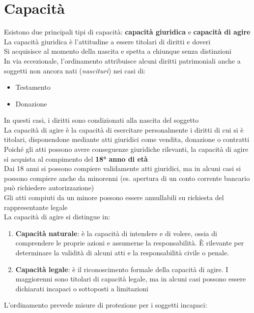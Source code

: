 \documentclass[8pt,oneside,a4paper]{article}
\begin{document}
	\section{Capacità}
	Esistono due principali tipi di capacità: \textbf{capacità giuridica} e \textbf{capacità di agire}\\
	La capacità giuridica è l'attitudine a essere titolari di diritti e doveri\\
	Si acquisisce al momento della nascita e spetta a chiunque senza distinzioni\\
	In via eccezionale, l'ordinamento attribuisce alcuni diritti patrimoniali anche a soggetti non ancora nati (\textit{nascituri}) nei casi di:  
	\begin{itemize}
		\item Testamento  
		\item Donazione  
	\end{itemize}
	In questi casi, i diritti sono condizionati alla nascita del soggetto\\
	La capacità di agire è la capacità di esercitare personalmente i diritti di cui si è titolari, disponendone mediante atti giuridici come vendita, donazione o contratti\\
	Poiché gli atti possono avere conseguenze giuridiche rilevanti, la capacità di agire si acquista al compimento del \textbf{18° anno di età}\\
	Dai 18 anni si possono compiere validamente atti giuridici, ma in alcuni casi si possono compiere anche da minorenni (es. apertura di un conto corrente bancario può richiedere autorizzazione)\\
	Gli atti compiuti da un minore possono essere annullabili su richiesta del rappresentante legale\\
	La capacità di agire si distingue in:  
	\begin{enumerate}
		\item \textbf{Capacità naturale}: è la capacità di intendere e di volere, ossia di comprendere le proprie azioni e assumerne la responsabilità. È rilevante per determinare la validità di alcuni atti e la responsabilità civile o penale. 
		\item \textbf{Capacità legale}: è il riconoscimento formale della capacità di agire. I maggiorenni sono titolari di capacità legale, ma in alcuni casi possono essere dichiarati incapaci o sottoposti a limitazioni
	\end{enumerate}
	L'ordinamento prevede misure di protezione per i soggetti incapaci:  
\end{document}
